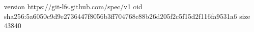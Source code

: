 version https://git-lfs.github.com/spec/v1
oid sha256:5a6050c9d9e2736447f8056b3ff704768c88b26d205f2c5f15d2f116fa9531a6
size 43840
